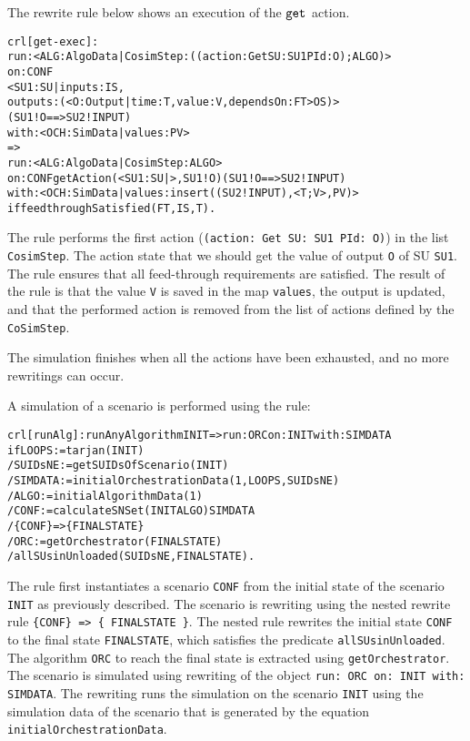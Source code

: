 The rewrite rule below shows an execution of the $\mathtt{get}_{}$ action.
\scriptsize
\begin{alltt}
crl [get-exec] : 
  run: < ALG : AlgoData | CosimStep : ((action: Get SU: SU1 PId: O) ; ALGO) >
  on: CONF
      < SU1 : SU | inputs : IS,
                  outputs : (< O : Output | time : T, value : V, dependsOn : FT > OS) > 
      ( SU1 ! O ==> SU2 ! INPUT)
  with: < OCH : SimData | values : PV >
  => 
  run: < ALG : AlgoData | CosimStep : ALGO >
  on: CONF getAction(< SU1 : SU | >, SU1 ! O) ( SU1 ! O ==> SU2 ! INPUT)
  with: < OCH : SimData | values : insert((SU2 ! INPUT), < T ; V >, PV) > 
if feedthroughSatisfied(FT, IS, T) .
\end{alltt}
\normalsize
The rule performs the first action (\texttt{(action: Get SU: SU1 PId: O)}) in the list \texttt{CosimStep}.
The action state that we should get the value of output \texttt{O} of SU \texttt{SU1}.
The rule ensures that all feed-through requirements are satisfied.
The result of the rule is that the value \texttt{V} is saved in the map \texttt{values}, the output is updated, and that the performed action is removed from the list of actions defined by the \texttt{CoSimStep}.

The simulation finishes when all the actions have been exhausted, and no more rewritings can occur.

A simulation of a scenario is performed using the rule:
\small
\begin{alltt}
crl [runAlg] : runAnyAlgorithm INIT => run: ORC on: INIT with: SIMDATA
  if LOOPS := tarjan(INIT)
  / SUIDsNE := getSUIDsOfScenario(INIT)
  / SIMDATA := initialOrchestrationData(1,LOOPS,SUIDsNE)
  / ALGO := initialAlgorithmData(1)
  / CONF := calculateSNSet(INIT ALGO) SIMDATA 
  / \{CONF\} => \{ FINALSTATE \} 
  / ORC := getOrchestrator(FINALSTATE)
  / allSUsinUnloaded(SUIDsNE, FINALSTATE) .
\end{alltt}
\normalsize
The rule first instantiates a scenario \texttt{CONF} from the initial state of the scenario \texttt{INIT} as previously described.
The scenario is rewriting using the nested rewrite rule \texttt{\{CONF\} => \{ FINALSTATE \}}. 
The nested rule rewrites the initial state \texttt{CONF} to the final state \texttt{FINALSTATE}, which satisfies the predicate \texttt{allSUsinUnloaded}.
The algorithm \texttt{ORC} to reach the final state is extracted using \texttt{getOrchestrator}.
The scenario is simulated using rewriting of the object \texttt{run: ORC on: INIT with: SIMDATA}.
The rewriting runs the simulation on the scenario \texttt{INIT} using the simulation data of the scenario that is generated by the equation \texttt{initialOrchestrationData}.

